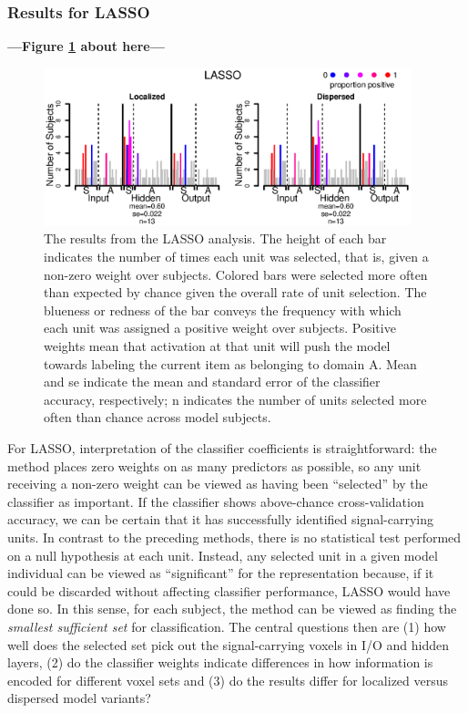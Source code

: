 \subsubsection{Results for LASSO}

\begin{center}
\textbf{---Figure \ref{fig.lasso} about here---}
\end{center}

\begin{figure}
\centering
\includegraphics[width=0.95\textwidth]{figures/lasso_only.eps}
\caption{The results from the LASSO analysis. The height of each bar indicates the number of times each unit was selected, that is, given a non-zero weight over subjects. Colored bars were selected more often than expected by chance given the overall rate of unit selection. The blueness or redness of the bar conveys the frequency with which each unit was assigned a positive weight over subjects. Positive weights mean that activation at that unit will push the model towards labeling the current item as belonging to domain A. Mean and se indicate the mean and standard error of the classifier accuracy, respectively; n indicates the number of units selected more often than chance across model subjects.}
\label{fig.lasso} 
\end{figure}

For LASSO, interpretation of the classifier coefficients is straightforward: the method places zero weights on as many predictors as possible, so any unit receiving a non-zero weight can be viewed as having been ``selected'' by the classifier as important. If the classifier shows above-chance cross-validation accuracy, we can be certain that it has successfully identified signal-carrying units. In contrast to the preceding methods, there is no statistical test performed on a null hypothesis at each unit. Instead, any selected unit in a given model individual can be viewed as ``significant'' for the representation because, if it could be discarded without affecting classifier performance, LASSO would have done so. In this sense, for each subject, the method can be viewed as finding the {\em smallest sufficient set} for classification. The central questions then are (1) how well does the selected set pick out the signal-carrying voxels in I/O and hidden layers, (2) do the classifier weights indicate differences in how information is encoded for different voxel sets and (3) do the results differ for localized versus dispersed model variants?

